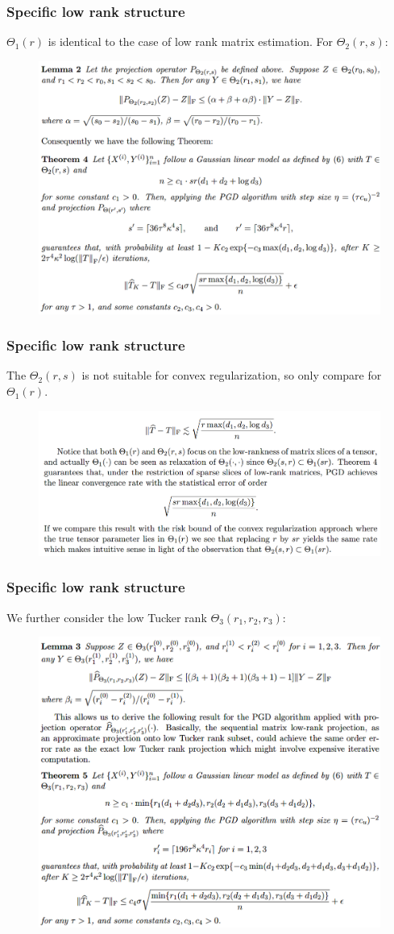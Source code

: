 \documentclass{beamer}
\begin{document}
	\begin{frame}
		\frametitle{Specific low rank structure}
		$\Theta_1(r)$ is identical to the case of low rank matrix estimation. For $\Theta_2(r,s)$:
		\begin{figure}
			\includegraphics[width=.7\linewidth]{image028.png}
		\end{figure}
	
	\end{frame}
	
	\begin{frame}
		\frametitle{Specific low rank structure}
		The $\Theta_2(r,s)$ is not suitable for convex regularization, so only compare for $\Theta_1(r)$.
		\begin{figure}
			\includegraphics[width=1\linewidth]{image029.png}
		\end{figure}
	\end{frame}
	
	\begin{frame}
		\frametitle{Specific low rank structure}
		We further consider the low Tucker rank $\Theta_3(r_1, r_2, r_3)$:
		\begin{figure}
			\includegraphics[width=.7\linewidth]{image030.png}
		\end{figure}
	\end{frame}
	
\end{document}
